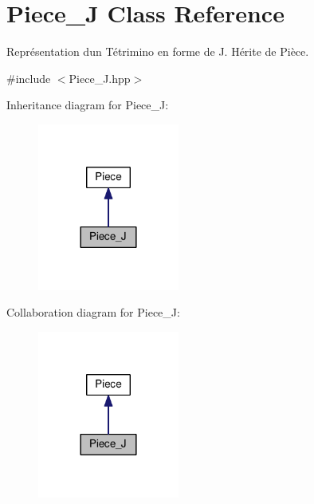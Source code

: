 \hypertarget{classPiece__J}{}\section{Piece\+\_\+J Class Reference}
\label{classPiece__J}


Représentation d\textquotesingle{}un Tétrimino en forme de J. Hérite de Pièce.  




{\ttfamily \#include $<$Piece\+\_\+\+J.\+hpp$>$}



Inheritance diagram for Piece\+\_\+J\+:
\nopagebreak
\begin{figure}[H]
\begin{center}
\leavevmode
\includegraphics[width=132pt]{classPiece__J__inherit__graph}
\end{center}
\end{figure}


Collaboration diagram for Piece\+\_\+J\+:
\nopagebreak
\begin{figure}[H]
\begin{center}
\leavevmode
\includegraphics[width=132pt]{classPiece__J__coll__graph}
\end{center}
\end{figure}
